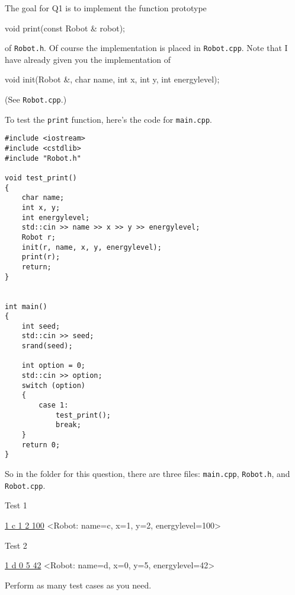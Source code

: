 The goal for Q1 is to implement the function prototype
{\small
\begin{console}
void print(const Robot & robot);
\end{console}
}
of \verb!Robot.h!.
Of course the implementation is placed in \verb!Robot.cpp!.
Note that I have already given you the implementation of
{\small
\begin{console}
void init(Robot &, char name, int x, int y, int energylevel);
\end{console}
}
(See \verb!Robot.cpp!.)

To test the \verb!print! function, 
here's the code for \verb!main.cpp!.
{\small
\begin{Verbatim}[frame=single]
#include <iostream>
#include <cstdlib>
#include "Robot.h"

void test_print()
{
    char name;
    int x, y;
    int energylevel;
    std::cin >> name >> x >> y >> energylevel;
    Robot r;
    init(r, name, x, y, energylevel);
    print(r);
    return;
}


int main()
{
    int seed;
    std::cin >> seed;
    srand(seed);

    int option = 0;
    std::cin >> option;
    switch (option)
    {
        case 1:
            test_print();
            break;
    }
    return 0;
}      
\end{Verbatim}
}
So in the folder for this question,
there are three files:
\verb!main.cpp!,
\verb!Robot.h!, and \verb!Robot.cpp!.


Test 1
\begin{console}[commandchars=\\\{\}]
\underline{1 c 1 2 100}
<Robot: name=c, x=1, y=2, energylevel=100>
\end{console}

Test 2
\begin{console}[commandchars=\\\{\}]
\underline{1 d 0 5 42}
<Robot: name=d, x=0, y=5, energylevel=42>
\end{console}


Perform as many test cases as you need.
